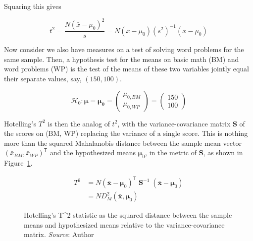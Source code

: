 \documentclass[
  letterpaper,
  10pt,
  krantz2]{krantz}
\begin{document}
Squaring this gives

\[
t^2 = \frac{N (\bar{x} - \mu_0)^2}{s} = N (\bar{x} - \mu_0)(s^2)^{-1} (\bar{x} - \mu_0)
\]

Now consider we also have measures on a test of solving word problems
for the same sample. Then, a hypothesis test for the means on basic math
(BM) and word problems (WP) is the test of the means of these two
variables jointly equal their separate values, say, \((150, 100)\).

\[
\mathcal{H}_0 : \mathbf{\mu} = \mathbf{\mu_0} =
  \begin{pmatrix}
    \mu_{0,BM} \\ \mu_{0,WP}
  \end{pmatrix}
  =
  \begin{pmatrix}
    150 \\ 100
  \end{pmatrix}
\]

Hotelling's \(T^2\) is then the analog of \(t^2\), with the
variance-covariance matrix \(\mathbf{S}\) of the scores on (BM, WP)
replacing the variance of a single score. This is nothing more than the
squared Mahalanobis distance between the sample mean vector
\((\bar{x}_{BM}, \bar{x}_{WP})^\mathsf{T}\) and the hypothesized means
\(\mathbf{\mu}_0\), in the metric of \(\mathbf{S}\), as shown in
Figure~\ref{fig-T2-diagram}.

\begin{align*}
T^2 &= N (\bar{\mathbf{x}} - \mathbf{\mu}_0)^\mathsf{T} \; \mathbf{S}^{-1} \; (\bar{\mathbf{x}} - \mathbf{\mu}_0) \\
    &= N D^2_M (\bar{\mathbf{x}}, \mathbf{\mu}_0)
\end{align*}

\begin{figure}


\caption{\label{fig-T2-diagram}Hotelling's T\^{}2 statistic as the
squared distance between the sample means and hypothesized means
relative to the variance-covariance matrix. \emph{Source}: Author}

\end{figure}%
\end{document}
